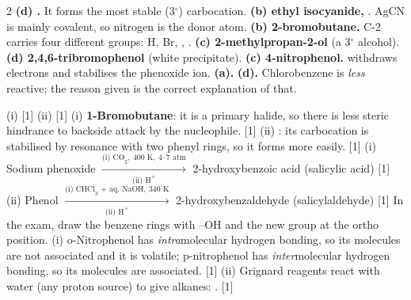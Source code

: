 \documentclass[10pt,a4paper]{extarticle}
\newcommand{\mk}[1]{{\scriptsize\color{black!55}[#1]}}
\begin{document}
\answerstart
\begin{multicols}{2}\raggedcolumns
{}
\An \textbf{(d) .} It forms the most stable (3$^\circ$) carbocation.
\An \textbf{(b) ethyl isocyanide,} . AgCN is mainly covalent, so nitrogen is the donor atom.
\An \textbf{(b) 2-bromobutane.} C-2 carries four different groups: H, Br, , .
\An \textbf{(c) 2-methylpropan-2-ol} (a 3$^\circ$ alcohol).
\An \textbf{(d) 2,4,6-tribromophenol} (white precipitate).
\An \textbf{(c) 4-nitrophenol.}  withdraws electrons and stabilises the phenoxide ion.
\An \textbf{(a).}
\An \textbf{(d).} Chlorobenzene is \emph{less} reactive; the reason given is the correct explanation of that.

\An (i)  \mk{1}\nl
(ii)  \mk{1}
\An (i) \textbf{1-Bromobutane}: it is a primary halide, so there is less steric hindrance to backside attack by the nucleophile. \mk{1}\nl
(ii) \textbf{}: its carbocation is stabilised by resonance with two phenyl rings, so it forms more easily. \mk{1}
\An (i) Sodium phenoxide $\xrightarrow[\text{(ii) H}^+]{\text{(i) CO}_2,\ 400\text{ K},\ 4\text{--}7\text{ atm}}$ 2-hydroxybenzoic acid (salicylic acid) \mk{1}\nl
(ii) Phenol $\xrightarrow[\text{(ii) H}^+]{\text{(i) CHCl}_3\text{ + aq. NaOH},\ 340\text{ K}}$ 2-hydroxybenzaldehyde (salicylaldehyde) \mk{1}\nl
{\scriptsize In the exam, draw the benzene rings with --OH and the new group at the ortho position.}
\An (i) o-Nitrophenol has \emph{intra}molecular hydrogen bonding, so its molecules are not associated and it is volatile; p-nitrophenol has \emph{inter}molecular hydrogen bonding, so its molecules are associated. \mk{1}\nl
(ii) Grignard reagents react with water (any proton source) to give alkanes: . \mk{1}


\end{multicols}
\end{document}
